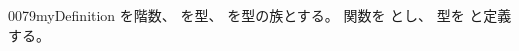 \documentclass[index]{subfiles}
\begin{document}
\begin{myBlock}{0079}{myDefinition}
  を階数、
  を型、
  を型の族とする。
  関数を
  とし、
  型を
  と定義する。
\end{myBlock}
\end{document}
